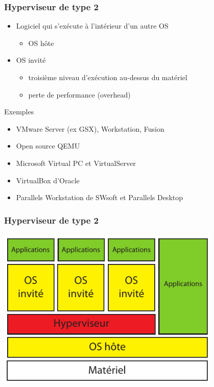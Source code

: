 \begin{frame}
\frametitle{Hyperviseur de type 2}
  \begin{itemize}
	  \item Logiciel qui s'exécute à l'intérieur d'un autre OS
	  \begin{itemize}
		    \item OS hôte
	  \end{itemize}
	  \item OS invité
	  \begin{itemize}
		  \item troisième niveau d'exécution au-dessus du matériel
		  \item perte de performance (overhead)
	  \end{itemize}
  \end{itemize}
  
\begin{exampleblock}{Exemples}
  \begin{itemize}
  \item VMware Server (ex GSX), Workstation, Fusion
  \item Open source QEMU
  \item Microsoft Virtual PC et VirtualServer
  \item VirtualBox d'Oracle
  \item Parallels Workstation de SWsoft et Parallels Desktop
\end{itemize}
\end{exampleblock}
\end{frame}


\begin{frame}
\frametitle{Hyperviseur de type 2}
\includegraphics[width=0.8\textwidth]{../illustration/hyperviseur_invit.pdf}
\end{frame}

